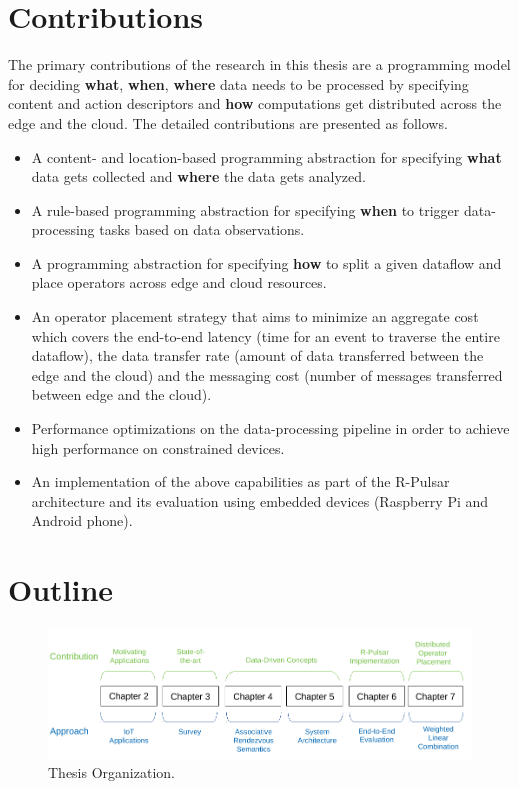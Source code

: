 \section{Contributions}
The primary contributions of the research in this thesis are a programming model for deciding \textbf{what}, \textbf{when}, \textbf{where} data needs to be processed by specifying content and action descriptors and \textbf{how} computations get distributed across the edge and the cloud. The detailed contributions are presented as follows.
\begin{itemize}
  \item A content- and location-based programming abstraction for specifying \textbf{what} data gets collected and \textbf{where} the data gets analyzed.
  \item A rule-based programming abstraction for specifying \textbf{when} to trigger data-processing tasks based on data observations.
  \item A programming abstraction for specifying \textbf{how} to split a given dataflow and place operators across edge and cloud resources.
  \item An operator placement strategy that aims to minimize an aggregate cost which covers the end-to-end latency (time for an event to traverse the entire dataflow), the data transfer rate (amount of data transferred between the edge and the cloud) and the messaging cost (number of messages transferred between edge and the cloud).
  \item Performance optimizations on the data-processing pipeline in order to achieve high performance on constrained devices.
  \item An implementation of the above capabilities as part of the R-Pulsar architecture and its evaluation using embedded devices (Raspberry Pi and Android phone).
\end{itemize}

\section{Outline}

\begin{figure}[h!]
  \centering
  \includegraphics[width=1\textwidth]{Figures/Outline.pdf}
  \caption{Thesis Organization.}
  \label{fig:Outline}
\end{figure}


